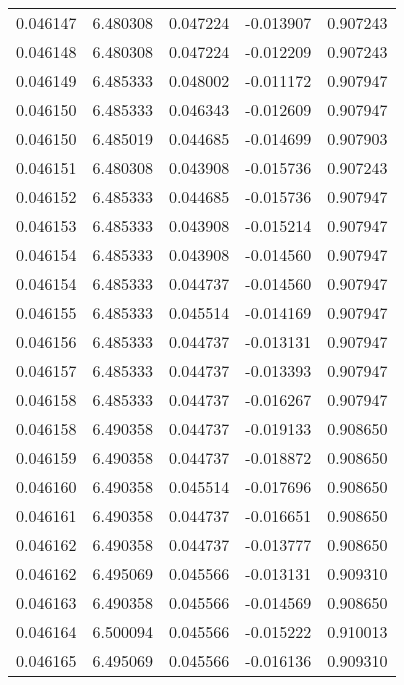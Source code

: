 \begin{tabular}{lrrrr}
0.046147    &  6.480308 &  0.047224 & -0.013907 &             0.907243 \\
0.046148    &  6.480308 &  0.047224 & -0.012209 &             0.907243 \\
0.046149    &  6.485333 &  0.048002 & -0.011172 &             0.907947 \\
0.046150    &  6.485333 &  0.046343 & -0.012609 &             0.907947 \\
0.046150    &  6.485019 &  0.044685 & -0.014699 &             0.907903 \\
0.046151    &  6.480308 &  0.043908 & -0.015736 &             0.907243 \\
0.046152    &  6.485333 &  0.044685 & -0.015736 &             0.907947 \\
0.046153    &  6.485333 &  0.043908 & -0.015214 &             0.907947 \\
0.046154    &  6.485333 &  0.043908 & -0.014560 &             0.907947 \\
0.046154    &  6.485333 &  0.044737 & -0.014560 &             0.907947 \\
0.046155    &  6.485333 &  0.045514 & -0.014169 &             0.907947 \\
0.046156    &  6.485333 &  0.044737 & -0.013131 &             0.907947 \\
0.046157    &  6.485333 &  0.044737 & -0.013393 &             0.907947 \\
0.046158    &  6.485333 &  0.044737 & -0.016267 &             0.907947 \\
0.046158    &  6.490358 &  0.044737 & -0.019133 &             0.908650 \\
0.046159    &  6.490358 &  0.044737 & -0.018872 &             0.908650 \\
0.046160    &  6.490358 &  0.045514 & -0.017696 &             0.908650 \\
0.046161    &  6.490358 &  0.044737 & -0.016651 &             0.908650 \\
0.046162    &  6.490358 &  0.044737 & -0.013777 &             0.908650 \\
0.046162    &  6.495069 &  0.045566 & -0.013131 &             0.909310 \\
0.046163    &  6.490358 &  0.045566 & -0.014569 &             0.908650 \\
0.046164    &  6.500094 &  0.045566 & -0.015222 &             0.910013 \\
0.046165    &  6.495069 &  0.045566 & -0.016136 &             0.909310 \\

\end{tabular}
